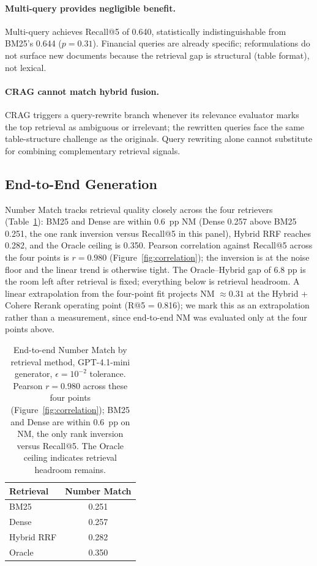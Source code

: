 \documentclass{article}
\begin{document}
\paragraph{Multi-query provides negligible benefit.} Multi-query achieves Recall@5 of 0.640, statistically indistinguishable from BM25's 0.644 ($p = 0.31$). Financial queries are already specific; reformulations do not surface new documents because the retrieval gap is structural (table format), not lexical.

\paragraph{CRAG cannot match hybrid fusion.} CRAG triggers a query-rewrite branch whenever its relevance evaluator marks the top retrieval as ambiguous or irrelevant; the rewritten queries face the same table-structure challenge as the originals. Query rewriting alone cannot substitute for combining complementary retrieval signals.

\subsection{End-to-End Generation}
\label{sec:generation}

Number Match tracks retrieval quality closely across the four retrievers (Table~\ref{tab:generation}): BM25 and Dense are within 0.6~pp NM (Dense 0.257 above BM25 0.251, the one rank inversion versus Recall@5 in this panel), Hybrid RRF reaches 0.282, and the Oracle ceiling is 0.350. Pearson correlation against Recall@5 across the four points is $r = 0.980$ (Figure~\ref{fig:correlation}); the inversion is at the noise floor and the linear trend is otherwise tight. The Oracle--Hybrid gap of 6.8 pp is the room left after retrieval is fixed; everything below is retrieval headroom. A linear extrapolation from the four-point fit projects NM $\approx 0.31$ at the Hybrid + Cohere Rerank operating point (R@5 = 0.816); we mark this as an extrapolation rather than a measurement, since end-to-end NM was evaluated only at the four points above.

\begin{table}[t]
\centering
\small
\begin{tabular}{lc}
\toprule
\textbf{Retrieval} & \textbf{Number Match} \\
\midrule
BM25       & 0.251 \\
Dense      & 0.257 \\
Hybrid RRF & 0.282 \\
Oracle     & 0.350 \\
\bottomrule
\end{tabular}
\vspace{4pt}
\caption{End-to-end Number Match by retrieval method, GPT-4.1-mini generator, $\epsilon = 10^{-2}$ tolerance. Pearson $r = 0.980$ across these four points (Figure~\ref{fig:correlation}); BM25 and Dense are within 0.6~pp on NM, the only rank inversion versus Recall@5. The Oracle ceiling indicates retrieval headroom remains.}
\label{tab:generation}
\end{table}
\end{document}
